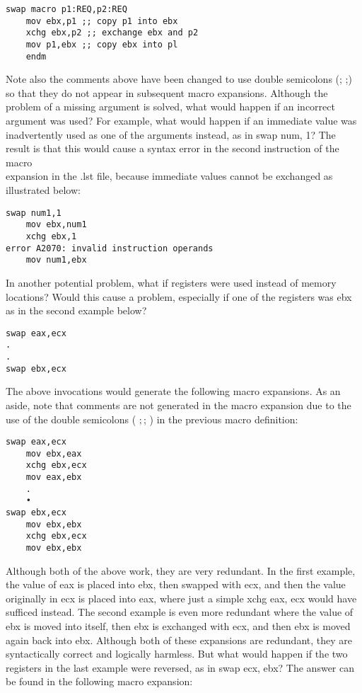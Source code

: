\documentclass[10pt]{article}
\begin{document}
\begin{verbatim}
swap macro p1:REQ,p2:REQ
    mov ebx,p1 ;; copy p1 into ebx
    xchg ebx,p2 ;; exchange ebx and p2
    mov p1,ebx ;; copy ebx into pl
    endm
\end{verbatim}

Note also the comments above have been changed to use double semicolons (; ;) so that they do not appear in subsequent macro expansions. Although the problem of a missing argument is solved, what would happen if an incorrect argument was used? For example, what would happen if an immediate value was inadvertently used as one of the arguments instead, as in swap num, 1? The result is that this would cause a syntax error in the second instruction of the macro\\
expansion in the .lst file, because immediate values cannot be exchanged as illustrated below:

\begin{verbatim}
swap num1,1
    mov ebx,num1
    xchg ebx,1
error A2070: invalid instruction operands
    mov num1,ebx
\end{verbatim}

In another potential problem, what if registers were used instead of memory locations? Would this cause a problem, especially if one of the registers was ebx as in the second example below?

\begin{verbatim}
swap eax,ecx
.
.
swap ebx,ecx
\end{verbatim}

The above invocations would generate the following macro expansions. As an aside, note that comments are not generated in the macro expansion due to the use of the double semicolons ( $;$; ) in the previous macro definition:

\begin{verbatim}
swap eax,ecx
    mov ebx,eax
    xchg ebx,ecx
    mov eax,ebx
    .
    •
swap ebx,ecx
    mov ebx,ebx
    xchg ebx,ecx
    mov ebx,ebx
\end{verbatim}

Although both of the above work, they are very redundant. In the first example, the value of eax is placed into ebx, then swapped with ecx, and then the value originally in ecx is placed into eax, where just a simple xchg eax, ecx would have sufficed instead. The second example is even more redundant where the value of ebx is moved into itself, then ebx is exchanged with ecx, and then ebx is moved again back into ebx. Although both of these expansions are redundant, they are syntactically correct and logically harmless. But what would happen if the two registers in the last example were reversed, as in swap ecx, ebx? The answer can be found in the following macro expansion:
\end{document}
